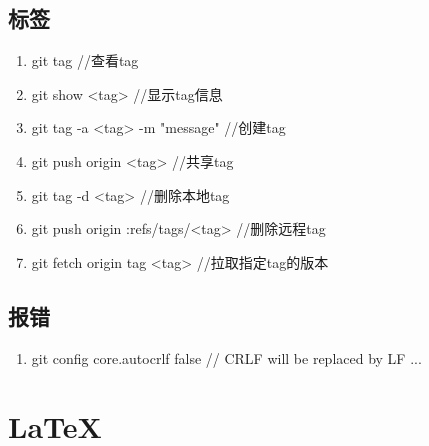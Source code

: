\documentclass[fontset=windows]{article}
\begin{document}
\subsection{标签}
\begin{enumerate}
    \item git tag //查看tag
    \item git show <tag> //显示tag信息
    \item git tag -a <tag> -m "message" //创建tag
    \item git push origin <tag> //共享tag
    \item git tag -d <tag> //删除本地tag
    \item git push origin :refs/tags/<tag> //删除远程tag
    \item git fetch origin tag <tag> //拉取指定tag的版本
\end{enumerate}

\subsection{报错}
\begin{enumerate}
    \item git config core.autocrlf false // CRLF will be replaced by LF ...
\end{enumerate}


\section{\LaTeX}
\end{document}
